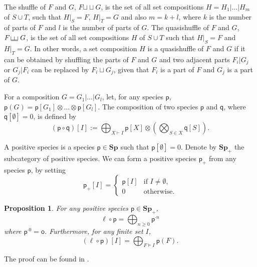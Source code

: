 \documentclass[11pt,reqno]{amsart}
\numberwithin{equation}{section}
\newtheorem{prop}[theorem]{Proposition}
\def\Sp{{\mathbf{Sp}}}
\def\p{{\textsf{p}}}
\def\q{{\textsf{q}}}
\def\o{{\textsf{o}}}
\newcommand{\quasishuf}{{\,\begin{picture}(10,5)
\multiput(0,0)(5,0){3}{\line(0,1){5}}%
\put(0,0){\line(1,0){10}}
\put(-0.2,-1){\line(1,0){10.5}}\end{picture}~}}
\def\shuf{{\sqcup\!\sqcup}}
\begin{document}
The shuffle of $F$ and $G$, $F\shuf G$, is the set of all set compositions $H=H_1|\dots|H_m$ of $S\cup T$, such that $H|_S=F$, $H|_T=G$ and also $m=k+l$, where $k$ is the number of parts of $F$ and $l$ is the number of parts of $G$. The quasishuffle of $F$ and $G$, $F\quasishuf G$, is the set of all set compositions $H$ of $S\cup T$ such that $H|_S=F$ and $H|_T=G$. In other words, a set composition $H$ is a quasishuffle of $F$ and $G$ if it can be obtained by shuffling the parts of $F$ and $G$ and two adjacent parts $F_i|G_j$ or $G_j|F_i$ can be replaced by $F_i\sqcup G_j$, given that $F_i$ is a part of $F$ and $G_j$ is a part of $G$.

For a composition $G=G_1|\dots|G_l$, let, for any species $\p$, $\p(G)=\p[G_1]\otimes \dots \otimes \p[G_l]$. The composition of two species $\p$ and $\q$, where $\q[\emptyset]=0$, is defined by
\begin{equation}
(\p\circ\q)[I]:=\bigoplus_{X\vdash I} \p[X] \otimes (\bigotimes_{S\in X} \q[S]).
\end{equation}

A positive species is a species $\p\in\Sp$ such that $\p[\emptyset]=0$. Denote by $\Sp_+$ the subcategory of positive species. We can form a positive species $\p_+$ from any species $\p$, by setting \begin{equation*} \p_+[I] = \begin{cases} \p[I] & \text{if $I\neq \emptyset$,}\\ 0 & \text{otherwise.} \end{cases} \end{equation*}


\begin{prop}
For any positive species $\p\in\Sp_+$,
\begin{equation}
\ell\circ\p=\bigoplus_{n\geq 0} \p^{\cdot n}
\end{equation}
where $\p^{\cdot 0}=\o$. Furthermore, for any finite set $I$,
$$(\ell\circ \p)[I]=\bigoplus_{F\models I} \p(F).$$
\end{prop}
The proof can be found in \cite{Aguiar}.
\end{document}
